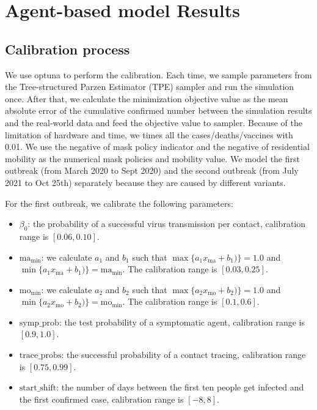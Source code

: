 \section{Agent-based model Results}
\label{sec-cal}
\subsection{Calibration process}
We use optuna to perform the calibration. Each time, we sample parameters from the Tree-structured Parzen Estimator (TPE) sampler and run the simulation once. After that, we calculate the minimization objective value as the mean absolute error of the cumulative confirmed number between the simulation results and the real-world data and feed the  objective value to sampler. Because of the limitation of hardware and time, we times all the cases/deaths/vaccines with 0.01. We use the negative of mask policy indicator and the negative of residential mobility as the numerical mask policies and mobility value. We model the first outbreak (from March 2020 to Sept 2020) and the second outbreak (from July 2021 to Oct 25th) separately because they are caused by different variants.

For the first outbreak, we calibrate the following parameters:

\begin{itemize}
	\item $\beta_0$: the probability of a successful virus transmission per contact, calibration range is $[0.06,0.10]$.
	\item $\text{ma}_{\min}$: we calculate $a_1$ and $b_1$ such that $\max\{a_1x_{\text{ma}}+b_1)\}=1.0$ and $\min\{a_1x_{\text{ma}}+b_1)\}=\text{ma}_{\min}$. The calibration range is $[0.03, 0.25]$.
	\item $\text{mo}_{\min}$: we calculate $a_2$ and $b_2$ such that $\max\{a_2x_{\text{mo}}+b_2)\}=1.0$ and $\min\{a_2x_{\text{mo}}+b_2)\}=\text{mo}_{\min}$. The calibration range is $[0.1, 0.6]$.
	\item $\text{symp\_prob}$: the test probability of a symptomatic agent, calibration range is $[0.9,1.0]$.
	\item $\text{trace\_probs}$: the successful probability of a contact tracing, calibration range is $[0.75,0.99]$.
	\item $\text{start\_shift}$: the number of days between the first ten people get infected and the first confirmed case, calibration range is $[-8,8]$.
\end{itemize}

